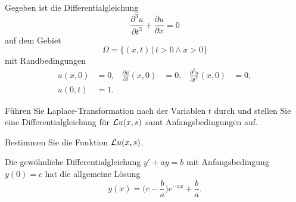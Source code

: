 Gegeben ist die Differentialgleichung
\begin{equation}
\frac{\partial^3 u}{\partial t^3}
+
\frac{\partial u}{\partial x}
=
0
\label{50000013:dgl}
\end{equation}
auf dem Gebiet
\[
\Omega = \{ (x,t)\,|\, t>0\wedge x > 0\}
\]
mit Randbedingungen
\begin{equation}
\begin{aligned}
u(x,0)&=0,
&
\frac{\partial u}{\partial t}(x,0)
&=
0,
&
\frac{\partial^2 u}{\partial t^2}(x,0)
&=0,
\\
u(0,t)&=1.
\end{aligned}
\end{equation}
\begin{teilaufgaben}
\item
Führen Sie Laplace-Transformation nach der Variablen $t$ durch und
stellen Sie eine Differentialgleichung für ${\cal L}u(x,s)$ samt
Anfangsbedingungen auf.
\item
Bestimmen Sie die Funktion ${\cal L}u(x,s)$.
\end{teilaufgaben}

\begin{hinweis}
Die gewöhnliche Differentialgleichung $y'+ay=b$ mit Anfangsbedingung $y(0)=c$
hat die allgemeine Lösung
\[
y(x) = \biggl(c-\frac{b}{a}\biggr)e^{-ax} + \frac{b}{a}.
\]
\end{hinweis}

